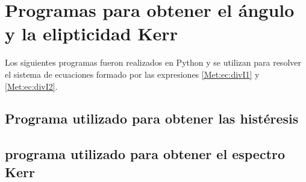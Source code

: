 \chapter{Programas para obtener el \'angulo y la elipticidad Kerr} \label{App:Py}
Los siguientes programas fueron realizados en Python y se utilizan para resolver el sistema de ecuaciones formado por las expresiones \ref{Met:ec:divI1} y \ref{Met:ec:divI2}.
\section{Programa utilizado para obtener las hist\'eresis}

\section{programa utilizado para obtener el espectro Kerr}

